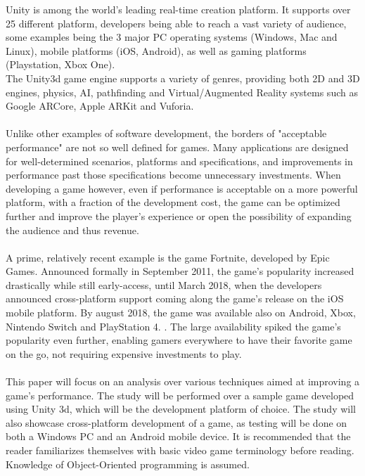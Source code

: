 Unity is among the world's leading real-time creation platform. It supports over 25 different platform, developers being able to reach a vast variety of audience, some examples being the 3 major PC operating systems (Windows, Mac and Linux), mobile platforms (iOS, Android), as well as gaming platforms (Playstation, Xbox One). \\
The Unity3d game engine supports a variety of genres, providing both 2D and 3D engines, physics, AI, pathfinding and Virtual/Augmented Reality systems such as Google ARCore, Apple ARKit and Vuforia. \cite{WhatIsUnity} \\ \\
Unlike other examples of software development, the borders of "acceptable performance" are not so well defined for games. Many applications are designed for well-determined scenarios, platforms and specifications, and improvements in performance past those specifications become unnecessary investments. When developing a game however, even if performance is acceptable on a more powerful platform, with a fraction of the development cost, the game can be optimized further and improve the player's experience or open the possibility of expanding the audience and thus revenue. \\ \\
A prime, relatively recent example is the game Fortnite, developed by Epic Games. Announced formally in September 2011, the game's popularity increased drastically while still early-access, until March 2018, when the developers announced cross-platform support coming along the game's release on the iOS mobile platform. By august 2018, the game was available also on Android, Xbox, Nintendo Switch and PlayStation 4. \cite{Fortnite}. The large availability spiked the game's popularity even further, enabling gamers everywhere to have their favorite game on the go, not requiring expensive investments to play. \\ \\
This paper will focus on an analysis over various techniques aimed at improving a game's performance. The study will be performed over a sample game developed using Unity 3d, which will be the development platform of choice. The study will also showcase cross-platform development of a game, as testing will be done on both a Windows PC and an Android mobile device. It is recommended that the reader familiarizes themselves with basic video game terminology before reading. Knowledge of Object-Oriented programming is assumed.
